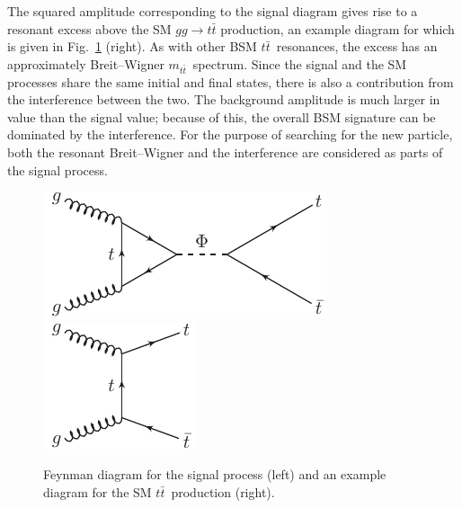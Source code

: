 The squared amplitude corresponding to the signal diagram gives rise to a resonant excess above the SM $gg \rightarrow t\bar t$ production, an example diagram for which is given in Fig.~\ref{Fig:FeynDiagrams} (right).
As with other BSM $t\bar t$~resonances, the excess has an approximately Breit–Wigner $m_{t\bar t}$~spectrum.
Since the signal and the SM processes share the same initial and final states, there is also a contribution from the interference between the two.
The background amplitude is much larger in value than the signal value; because of this, the overall BSM signature can be dominated by the interference.
For the purpose of searching for the new particle, both the resonant Breit–Wigner and the interference are considered as parts of the signal process.

\begin{figure}
 \centering
 \includegraphics{fig/chapt4/sgn.pdf}\qquad
 \includegraphics{fig/chapt4/tt-tchan.pdf}
 \caption{Feynman diagram for the signal process (left) and an example diagram for the SM $t\bar t$~production (right).}
 \label{Fig:FeynDiagrams}
\end{figure}
